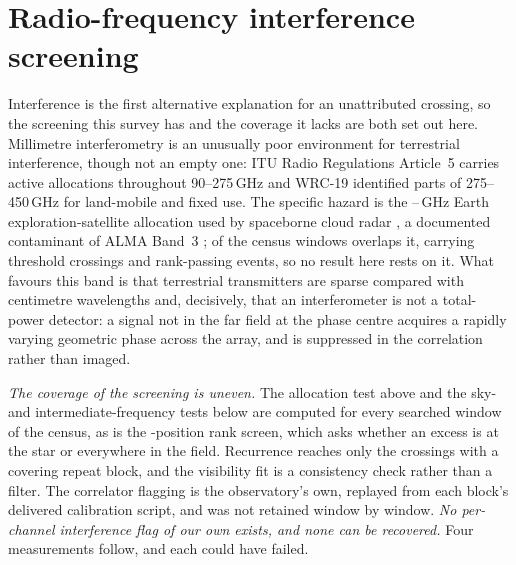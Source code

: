 \section{Radio-frequency interference screening}
\label{app:rfi}

Interference is the first alternative explanation for an unattributed
crossing, so the screening this survey has and the coverage it lacks are both
set out here. Millimetre interferometry is an unusually poor
environment for terrestrial interference, though not an empty one: ITU Radio
Regulations Article~5 \citep{ITU2024} carries active allocations throughout
90--275\,GHz and WRC-19 identified parts of 275--450\,GHz for land-mobile and
fixed use. The specific hazard is the \RadarLo--\RadarHi\,GHz Earth
exploration-satellite allocation used by spaceborne cloud radar
\citep{CloudSat2002,EarthCARE2023}, a documented contaminant of ALMA Band~3
\citep{ALMAMemo504};
\RadarNWin{} of the \RadarNTot{} census windows overlaps it, carrying
\RadarNCross{} threshold crossings and \RadarNStage{} rank-passing events, so
no result here rests on it. What favours this band is that terrestrial
transmitters are sparse compared with centimetre wavelengths and, decisively,
that an interferometer is not a total-power detector: a signal not in the far
field at the phase centre acquires a rapidly varying geometric phase across
the array, and is suppressed in the correlation rather than imaged.

\emph{The coverage of the screening is uneven.} The allocation test above and
the sky- and intermediate-frequency tests below are computed for every
searched window of the census, as is the \NCtrl-position rank screen, which
asks whether an excess is at the star or everywhere in the field. Recurrence
reaches only the crossings with a covering repeat block, and the visibility
fit is a consistency check rather than a filter. The correlator flagging is
the observatory's own, replayed from each block's delivered calibration
script, and was not retained window by window. \emph{No per-channel
interference flag of our own exists, and none can be recovered.} Four
measurements follow, and each could have failed.

